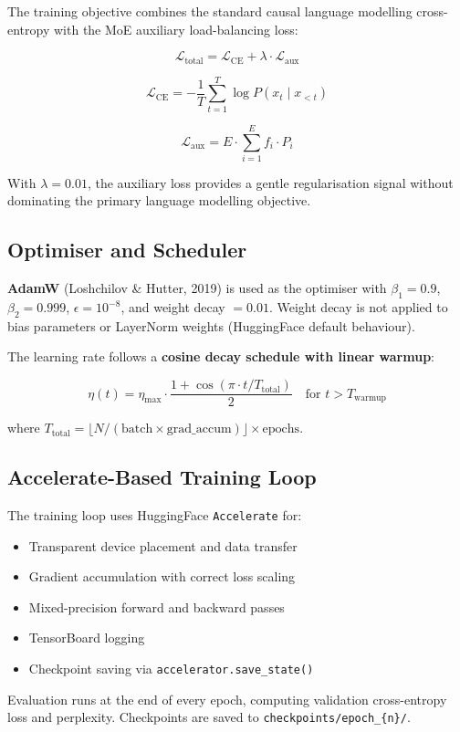 \documentclass[11pt]{article}
\begin{document}
The training objective combines the standard causal language modelling cross-entropy with the MoE auxiliary load-balancing loss:


$$\mathcal{L}_{\text{total}} = \mathcal{L}_{\text{CE}} + \lambda \cdot \mathcal{L}_{\text{aux}}$$


$$\mathcal{L}_{\text{CE}} = -\frac{1}{T}\sum_{t=1}^{T} \log P(x_t \mid x_{<t})$$


$$\mathcal{L}_{\text{aux}} = E \cdot \sum_{i=1}^{E} f_i \cdot P_i$$


With $\lambda = 0.01$, the auxiliary loss provides a gentle regularisation signal without dominating the primary language modelling objective.


\subsection{Optimiser and Scheduler}


\textbf{AdamW} (Loshchilov \& Hutter, 2019) is used as the optimiser with $\beta_1=0.9$, $\beta_2=0.999$, $\epsilon=10^{-8}$, and weight decay $= 0.01$. Weight decay is not applied to bias parameters or LayerNorm weights (HuggingFace default behaviour).


The learning rate follows a \textbf{cosine decay schedule with linear warmup}:


$$\eta(t) = \eta_{\max} \cdot \frac{1 + \cos(\pi \cdot t / T_{\text{total}})}{2} \quad \text{for } t > T_{\text{warmup}}$$


where $T_{\text{total}} = \lfloor N / (\text{batch} \times \text{grad\_accum}) \rfloor \times \text{epochs}$.


\subsection{Accelerate-Based Training Loop}


The training loop uses HuggingFace \texttt{Accelerate} for:

\begin{itemize}[leftmargin=*]
\item Transparent device placement and data transfer
\item Gradient accumulation with correct loss scaling
\item Mixed-precision forward and backward passes
\item TensorBoard logging
\item Checkpoint saving via \texttt{accelerator.save\_state()}

\end{itemize}
Evaluation runs at the end of every epoch, computing validation cross-entropy loss and perplexity. Checkpoints are saved to \texttt{checkpoints/epoch\_\{n\}/}.
\end{document}
